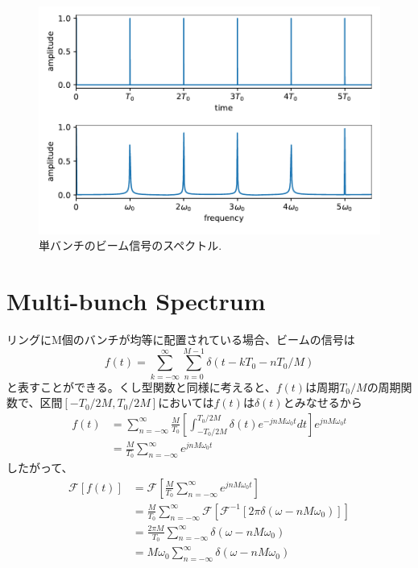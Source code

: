 \documentclass[]{jlreq}
\theoremstyle{definition}
\begin{document}
\begin{figure}[hbt]
  \begin{center}
    \includegraphics[width=12cm,clip]{single_bunch.pdf}
    \caption{単バンチのビーム信号のスペクトル.}
   \label{single_bunch}
  \end{center}
\end{figure}
%
\section{Multi-bunch Spectrum}
リングにM個のバンチが均等に配置されている場合、ビームの信号は
%
\begin{equation}
  f(t) = \sum_{k=-\infty}^{\infty} \sum_{n=0}^{M-1}\delta (t - k T_0 -n T_0 / M)
\end{equation}
%
と表すことができる。くし型関数と同様に考えると、$f(t)$は周期$T_0/M$の周期関数で、区間$[-T_0/2M, T_0/2M]$においては$f(t)$は$\delta(t)$とみなせるから
%
%
\begin{align}
  f(t) &= \sum_{n = -\infty}^{\infty} \frac{M}{T_0} \left[\int_{-T_0/2M}^{T_0/2M}\delta (t) e^{-j n M \omega_0 t} dt\right] 
  e^{j n M \omega_0 t} \\
              &= \frac{M}{T_0} \sum_{n = -\infty}^{\infty} e^{j n M \omega_0 t} 
\end{align}
%
したがって、
%
\begin{align}
  \mathcal{F}[f(t)] &= \mathcal{F}\left[\frac{M}{T_0} \sum_{n = -\infty}^{\infty} e^{j n M \omega_0 t}\right] \\ 
      & = \frac{M}{T_0} \sum_{n = -\infty}^{\infty} \mathcal{F}[\mathcal{F}^{-1}[2\pi \delta(\omega - n M \omega_0)]] \\ 
      & = \frac{2 \pi M}{T_0} \sum_{n = -\infty}^{\infty} \delta(\omega - n M \omega_0)\\ 
      &= M \omega_0 \sum_{n = -\infty}^{\infty} \delta(\omega - n M \omega_0)
\end{align}
%
\end{document}
